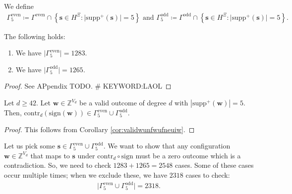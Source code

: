 \begin{definition}
    We define 
    \begin{gather*}
        \Gamma^{\mathrm{even}}_5 \coloneqq \Gamma^{\mathrm{even}} \cap \left\{ \mathbf{s} \in H^{\Xi} : \lvert \mathrm{supp}^+(\mathbf{s}) \rvert = 5 \right\}
        \text{ and }
        \Gamma^{\mathrm{odd}}_5 \coloneqq \Gamma^{\mathrm{odd}} \cap \left\{ \mathbf{s} \in H^{\Xi} : \lvert \mathrm{supp}^+(\mathbf{s}) \rvert = 5 \right\}.
    \end{gather*}
\end{definition}

\begin{proposition}
    The following holds:
    \begin{enumerate}
        \item We have \( \lvert \Gamma^{\mathrm{even}}_5 \rvert  = 1283\).
        \item We have \( \lvert \Gamma^{\mathrm{odd}}_5 \rvert  = 1265\).
    \end{enumerate}
\end{proposition}

\begin{proof}
    See APpendix TODO. \# KEYWORD:LAOL
\end{proof}

\begin{corollary}
    Let \( d\geq 42 \). Let \( \mathbf{w} \in \mathbb{Z}^{V_d} \) be a valid outcome of degree \( d \) with \( |\mathrm{supp}^+(\mathbf w)| = 5 \). Then, \( \mathrm{contr}_d(\mathrm{sign}(\mathbf{w})) \in \Gamma^{\mathrm{even}}_5 \cup \Gamma^{\mathrm{odd}}_5 \).
\end{corollary}

\begin{proof}
    This follows from Corollary \ref{cor:validwunfwufneuiw}.
\end{proof}

Let us pick some \( \mathbf{s} \in \Gamma^{\mathrm{even}}_5 \cup \Gamma^{\mathrm{odd}}_5 \). We want to show that any configuration \( \mathbf{w} \in \mathbb{Z}^{V_d} \) that maps to \( \mathbf{s} \) under \( \mathrm{contr}_d \circ \mathrm{sign} \) must be a zero outcome which is a contradiction. So, we need to check \( 1283 + 1265 = 2548 \) cases.
Some of these cases occur multiple times; when we exclude these, we have \( 2318 \) cases to check:
\begin{align*}
    \lvert \Gamma^{\mathrm{even}}_5 \cup \Gamma^{\mathrm{odd}}_5  \rvert = 2318.
\end{align*}

